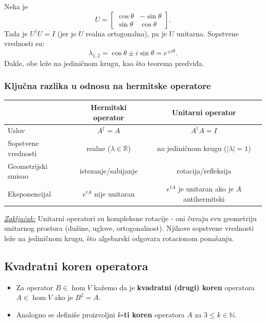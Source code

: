 \documentclass[a4paper,12pt,twoside]{report}
\numberwithin{algorithm}{section}
\begin{document}
Neka je
\[
    U = \begin{bmatrix}
        \cos\theta & -\sin\theta \\
        \sin\theta & \cos\theta
    \end{bmatrix}.
\]
Tada je $U^\dagger U = I$ (jer je $U$ realna ortogonalna), pa je $U$ unitarna. Sopstvene vrednosti su:
\[
    \lambda_{1,2} = \cos\theta \pm i\sin\theta = e^{\pm i\theta}.
\]
Dakle, obe leže na jediničnom krugu, kao što teorema predviđa.

\subsubsection{Ključna razlika u odnosu na hermitske operatore}

\begin{center}
\begin{tabular}{l|c|c}
    & \textbf{Hermitski operator} & \textbf{Unitarni operator} \\ \hline
    Uslov & $A^\dagger = A$ & $A^\dagger A = I$ \\
    Sopstvene vrednosti & realne ($\lambda \in \mathbb{R}$) & na jediničnom krugu ($|\lambda| = 1$) \\
    Geometrijski smisao & istezanje/sabijanje & rotacija/refleksija \\
    Eksponencijal & $e^{tA}$ nije unitaran & $e^{tA}$ je unitaran ako je $A$ antihermitski \\
\end{tabular}
\end{center}

\medskip
\noindent\underline{\textit{Zaključak:}} Unitarni operatori su kompleksne rotacije - oni čuvaju svu geometriju unitarnog prostora (dužine, uglove, ortogonalnost). Njihove sopstvene vrednosti leže na jediničnom krugu, što algebarski odgovara rotacionom ponašanju.
\newpage

\subsection{Kvadratni koren operatora}

\begin{itemize}
    \item Za operator $B \in \hom V$ kažemo da je \textbf{kvadratni (drugi) koren} operatora $A \in \hom V$ ako je $B^2 = A$.
    \item Analogno se definiše proizvoljni \textbf{$k$-ti koren} operatora $A$ za $3 \leq k \in \mathbb{N}$.
\end{itemize}
\end{document}
